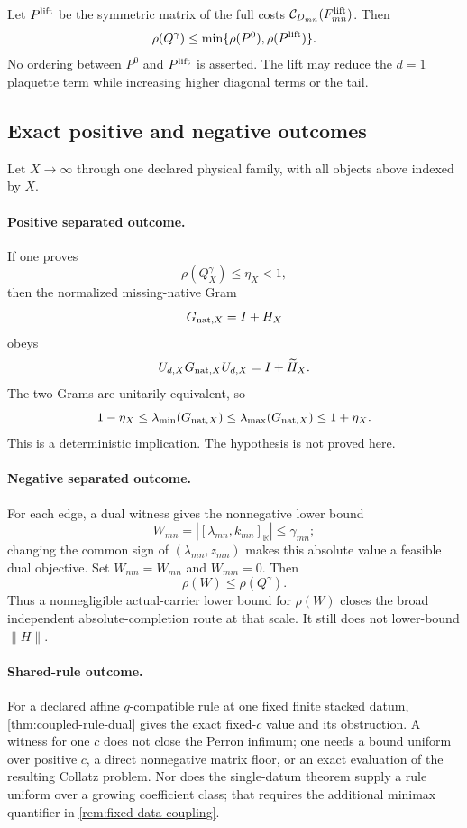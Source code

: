 Let \(P^{\rm lift}\) be the symmetric matrix of the full costs
\(\mathcal C_{D_{mn}}(F^{\rm lift}_{mn})\).  Then
\begin{equation}
 \rho(Q^\gamma)
 \le
 \min\{\rho(P^0),\rho(P^{\rm lift})\}.
 \label{eq:lift-upper-bound}
\end{equation}
No ordering between \(P^0\) and \(P^{\rm lift}\) is asserted.
The lift may reduce the \(d=1\) plaquette term while increasing higher
diagonal terms or the tail.

\subsection{Exact positive and negative outcomes}

Let \(X\to\infty\) through one declared physical family, with all objects
above indexed by \(X\).

\paragraph{Positive separated outcome.}
If one proves
\[
 \rho(Q^\gamma_X)\le\eta_X<1,
\]
then the normalized missing-native Gram
\[
 G_{{\rm nat},X}=I+H_X
\]
obeys
\[
 U_{d,X}G_{{\rm nat},X}U_{d,X}
 =
 I+\widetilde H_X.
\]
The two Grams are unitarily equivalent, so
\[
 1-\eta_X
 \le\lambda_{\min}(G_{{\rm nat},X})
 \le\lambda_{\max}(G_{{\rm nat},X})
 \le1+\eta_X.
\]
This is a deterministic implication.  The hypothesis is not proved
here.

\paragraph{Negative separated outcome.}
For each edge, a dual witness gives the nonnegative lower bound
\[
 W_{mn}
 =
 \left|
 [\lambda_{mn},k_{mn}]_{\mathbb R}
 \right|
 \le\gamma_{mn};
\]
changing the common sign of \((\lambda_{mn},z_{mn})\) makes this absolute
value a feasible dual objective.
Set \(W_{nm}=W_{mn}\) and \(W_{mm}=0\).  Then
\[
\rho(W)\le\rho(Q^\gamma).
\]
Thus a nonnegligible actual-carrier lower bound for \(\rho(W)\) closes the
broad independent absolute-completion route at that scale.  It still
does not lower-bound \(\|H\|\).

\paragraph{Shared-rule outcome.}
For a declared affine \(q\)-compatible rule at one fixed finite stacked
datum,
\cref{thm:coupled-rule-dual} gives the exact fixed-\(c\) value and its
obstruction.  A witness for one \(c\) does not close the Perron infimum;
one needs a bound uniform over positive \(c\), a direct nonnegative
matrix floor, or an exact evaluation of the resulting Collatz problem.
Nor does the single-datum theorem supply a rule uniform over a growing
coefficient class; that requires the additional minimax quantifier in
\cref{rem:fixed-data-coupling}.

